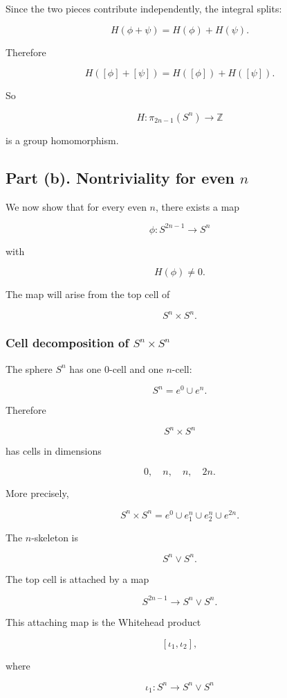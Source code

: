\documentclass[12pt,a4paper]{article}
\theoremstyle{notespace}
\begin{document}
Since the two pieces contribute independently, the integral splits:

\[
H(\phi+\psi)=H(\phi)+H(\psi).
\]

Therefore

\[
\boxed{
	H([\phi]+[\psi])=H([\phi])+H([\psi]).
}
\]

So

\[
\boxed{
	H:\pi_{2n-1}(S^n)\longrightarrow \mathbb Z
}
\]

is a group homomorphism.

\subsection{Part (b). Nontriviality for even \(n\)}

We now show that for every even \(n\), there exists a map

\[
\phi:S^{2n-1}\to S^n
\]

with

\[
H(\phi)\neq 0.
\]

The map will arise from the top cell of

\[
S^n\times S^n.
\]

\subsubsection*{Cell decomposition of \(S^n\times S^n\)}

The sphere \(S^n\) has one \(0\)-cell and one \(n\)-cell:

\[
S^n=e^0\cup e^n.
\]

Therefore

\[
S^n\times S^n
\]

has cells in dimensions

\[
0,\quad n,\quad n,\quad 2n.
\]

More precisely,

\[
S^n\times S^n
=
e^0
\cup e^n_1
\cup e^n_2
\cup e^{2n}.
\]

The \(n\)-skeleton is

\[
S^n\vee S^n.
\]

The top cell is attached by a map

\[
S^{2n-1}\longrightarrow S^n\vee S^n.
\]

This attaching map is the Whitehead product

\[
[\iota_1,\iota_2],
\]

where

\[
\iota_1:S^n\to S^n\vee S^n
\]
\end{document}
